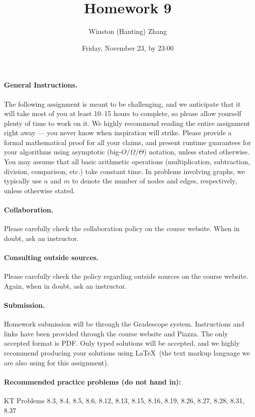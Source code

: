 \documentclass[10pt]{article}
\title{\bf Homework 9}
\author{Winston (Hanting) Zhang}
\date{Friday, November 23, by 23:00}
\begin{document}
\maketitle

\paragraph{General Instructions.} The following assignment is meant to be challenging, and we anticipate that it will take most of you at least 10--15 hours to complete, so please allow yourself plenty of time to work on it.
We highly recommend reading the entire assignment right away --- you never know when inspiration will strike.
Please provide a formal mathematical proof for all your claims, and  present runtime guarantees for your algorithms using asymptotic (big-$O/\Omega/\Theta$) notation, unless stated otherwise. You may assume that all basic arithmetic operations (multiplication, subtraction, division, comparison, etc.) take constant time. In problems involving graphs, we typically use $n$ and $m$ to denote the number of nodes and edges, respectively, unless otherwise stated.

\paragraph{Collaboration.}  Please carefully check the collaboration policy on the course website. When in doubt, ask an instructor.

\paragraph{Consulting outside sources.} Please carefully check the policy regarding outside sources on the course website. Again, when in doubt, ask an instructor.

\paragraph{Submission.} Homework submission will be through the Gradescope system. Instructions and links have been provided through the course website and Piazza. The only accepted format is PDF. Only typed solutions will be accepted, and we highly recommend producing your solutions using \LaTeX~(the text markup language we are also using for this assignment).

\paragraph{Recommended practice problems (do not hand in):} KT Problems 8.3, 8.4, 8.5, 8.6, 8.12, 8.13, 8.15, 8.16, 8.19, 8.26, 8.27, 8.28, 8.31, 8.37
\end{document}
